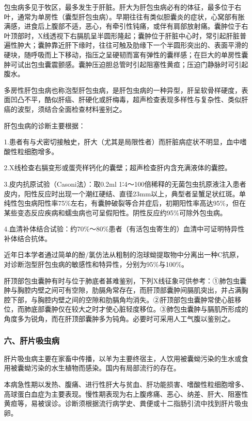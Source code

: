 包虫病多见于牧区，最多发生于肝脏。肝大为肝包虫病必有的体征，最多位于右叶，通常为单房性（囊型肝包虫病）。早期往往有类似胆囊炎的症状，心窝部有胀满感，进食后上腹部不适，恶心，有牵引性钝痛，或伴有肩部放射痛。囊肿位于右叶顶部时，X线透视下右膈肌呈半圆形隆起；囊肿位于肝脏中心时，常引起肝脏普遍性肿大；囊肿靠近肝下缘时，往往可触及肋缘下一个半圆形突出的、表面平滑的硬块，随呼吸而上下移动，指压之呈硬韧而富有弹性的囊样感；在巨大的单房性囊肿可试出包虫囊震颤感。囊肿压迫胆总管时引起阻塞性黄疸；压迫门静脉时可引起腹水。

多房性肝包虫病也称泡型肝包虫病，是肝包虫病的一种异型，肝呈软骨样硬度，表面凹凸不平，酷似肝癌、肝硬化或肝梅毒，超声检查表现多样性与复杂性、类似肝癌的波型，须结合全面检查材料鉴别之。

肝包虫病的诊断主要根据：

1.患者有与犬密切接触史，肝大（尤其是局限性者）而肝脏病症状不明显，血中嗜酸性粒细胞增多。

2.X线检查右膈变形或蛋壳样钙化的囊壁；超声检查肝内含充满液体的囊腔。

3.皮内抗原试验（Casoni法）：取0.2ml
1∶4～100倍稀释的无菌包虫抗原液注入患者皮内，阳性反应时出现一个潮红硬结、直径23mm以上，典型者呈蟹足状红斑。单纯性包虫病阳性率75\%左右，有囊肿破裂等合并症后，初期阳性率高达95\%，但在某些变态反应疾病和蠕虫病也可呈假阳性。阴性反应约95\%可除外包虫病。

4.血清补体结合试验：约70\%～80\%患者（有活包虫寄生的）血清中可证明特异性补体结合抗体。

近年日本学者通过简单的酚/氯仿法从粗制的泡球蚴提取物中分离出一种C抗原，对诊断泡型肝包虫病的敏感性和特异性，分别为95\%与100\%。

肝顶部包虫囊肿有时与位于肺底者甚难鉴别，下列X线征象可供参考：①肺包虫囊肿与胸腔内壁之间可有空隙，肋膈角常存在，而肝顶部囊肿间膈肌突出，并占满胸腔下部，与胸腔内壁之间的空隙和肋膈角均消失。②肝顶部包虫囊肿常使心脏移位，而肺底部囊肿仅在较大之时才使心脏轻度移位。③肺包虫囊肿与膈肌所形成的角度多为锐角，而在肝顶部囊肿多为钝角。必要时可采用人工气腹以鉴别之。

\subsubsection{六、肝片吸虫病}

肝片吸虫病主要在家畜中传播，以羊为主要终宿主，人饮用被囊蚴污染的生水或食用被囊蚴污染的水生植物而感染。国内有局部流行的存在。

本病急性期以发热、腹痛、进行性肝大与贫血、肝功能损害、嗜酸性粒细胞增多、高球蛋白血症为主要表现。慢性期表现为右上腹疼痛、恶心、纳差、肝大、阻塞性黄疸等，易被误诊。诊断须根据流行病学史、粪便或十二指肠引流中找到肝片吸虫卵。

